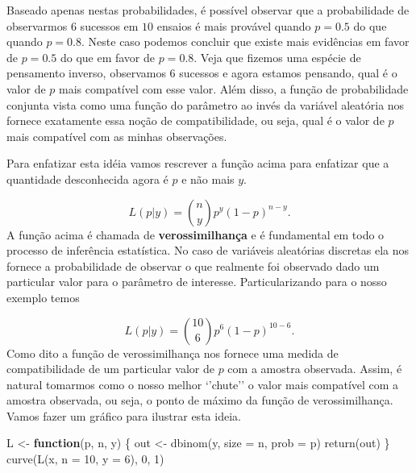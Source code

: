 \documentclass[
  10pt,
  a4paper]{book}
\newenvironment{Shaded}{\begin{snugshade}}{\end{snugshade}}
\newcommand{\AttributeTok}[1]{\textcolor[rgb]{0.77,0.63,0.00}{#1}}
\newcommand{\ControlFlowTok}[1]{\textcolor[rgb]{0.13,0.29,0.53}{\textbf{#1}}}
\newcommand{\DecValTok}[1]{\textcolor[rgb]{0.00,0.00,0.81}{#1}}
\newcommand{\FunctionTok}[1]{\textcolor[rgb]{0.00,0.00,0.00}{#1}}
\newcommand{\NormalTok}[1]{#1}
\newcommand{\OtherTok}[1]{\textcolor[rgb]{0.56,0.35,0.01}{#1}}
\begin{document}
Baseado apenas nestas probabilidades, é possível observar que a probabilidade de observarmos \(6\) sucessos em \(10\) ensaios é mais provável quando \(p = 0.5\) do que quando \(p = 0.8\). Neste caso podemos concluir que existe mais evidências em favor de \(p=0.5\) do que em favor de \(p = 0.8\). Veja que fizemos uma espécie de pensamento inverso, observamos \(6\) sucessos e agora estamos pensando, qual é o valor de \(p\) mais compatível com esse valor. Além disso, a função de probabilidade conjunta vista como uma função do parâmetro ao invés da variável aleatória nos fornece exatamente essa noção de compatibilidade, ou seja, qual é o valor de \(p\) mais compatível com as minhas observações.

Para enfatizar esta idéia vamos rescrever a função acima para enfatizar que a quantidade desconhecida agora é \(p\) e não mais \(y\).

\[
L(p|y) = \binom{n}{y} p^y (1-p)^{n-y}.
\]
A função acima é chamada de \textbf{verossimilhança} e é fundamental em todo o processo de inferência estatística. No caso de variáveis aleatórias discretas ela nos fornece a probabilidade de observar o que realmente foi observado dado um particular valor para o parâmetro de interesse. Particularizando para o nosso exemplo temos

\[
L(p|y) = \binom{10}{6} p^6 (1-p)^{10-6}.
\]
Como dito a função de verossimilhança nos fornece uma medida de compatibilidade de um particular valor de \(p\) com a amostra observada. Assim, é natural tomarmos como o nosso melhor `'chute'' o valor mais compatível com a amostra observada, ou seja, o ponto de máximo da função de verossimilhança. Vamos fazer um gráfico para ilustrar esta ideia.

\begin{Shaded}
\begin{Highlighting}[]
\NormalTok{L }\OtherTok{\textless{}{-}} \ControlFlowTok{function}\NormalTok{(p, n, y) \{}
\NormalTok{  out }\OtherTok{\textless{}{-}} \FunctionTok{dbinom}\NormalTok{(y, }\AttributeTok{size =}\NormalTok{ n, }\AttributeTok{prob =}\NormalTok{ p)}
  \FunctionTok{return}\NormalTok{(out)}
\NormalTok{\}}
\FunctionTok{curve}\NormalTok{(}\FunctionTok{L}\NormalTok{(x, }\AttributeTok{n =} \DecValTok{10}\NormalTok{, }\AttributeTok{y =} \DecValTok{6}\NormalTok{), }\DecValTok{0}\NormalTok{, }\DecValTok{1}\NormalTok{)}
\end{Highlighting}
\end{Shaded}
\end{document}
